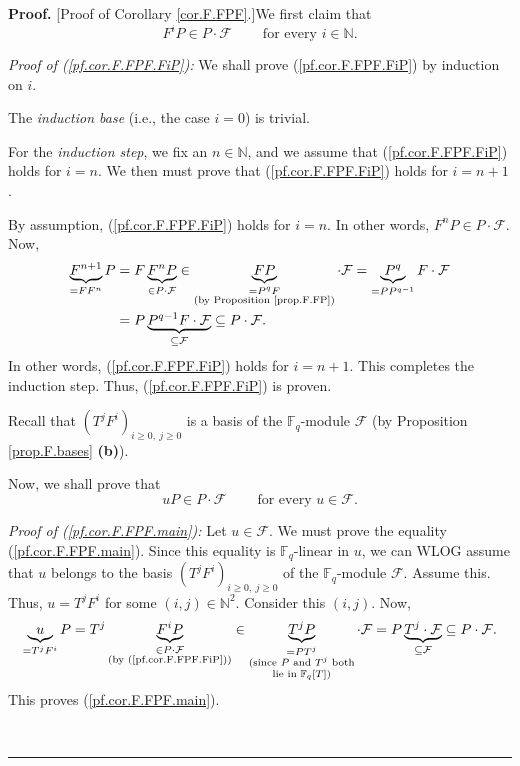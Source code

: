 \documentclass[numbers=enddot,12pt,final,onecolumn,notitlepage]{scrartcl}%
\theoremstyle{definition}
\newenvironment{proof}[1][Proof]{\noindent\textbf{#1.} }{\ \rule{0.5em}{0.5em}}
\begin{document}
\begin{proof}
[Proof of Corollary \ref{cor.F.FPF}.]We first claim that%
\begin{equation}
F^{i}P\in P\cdot\mathcal{F}\ \ \ \ \ \ \ \ \ \ \text{for every }i\in
\mathbb{N}. \label{pf.cor.F.FPF.FiP}%
\end{equation}


\textit{Proof of (\ref{pf.cor.F.FPF.FiP}):} We shall prove
(\ref{pf.cor.F.FPF.FiP}) by induction on $i$.

The \textit{induction base} (i.e., the case $i=0$) is trivial.

For the \textit{induction step}, we fix an $n\in\mathbb{N}$, and we assume
that (\ref{pf.cor.F.FPF.FiP}) holds for $i=n$. We then must prove that
(\ref{pf.cor.F.FPF.FiP}) holds for $i=n+1$.

By assumption, (\ref{pf.cor.F.FPF.FiP}) holds for $i=n$. In other words,
$F^{n}P\in P\cdot\mathcal{F}$. Now,%
\begin{align*}
\underbrace{F^{n+1}}_{=FF^{n}}P  &  =F\underbrace{F^{n}P}_{\in P\cdot
\mathcal{F}}\in\underbrace{FP}_{\substack{=P^{q}F\\\text{(by Proposition
\ref{prop.F.FP})}}}\cdot\mathcal{F}=\underbrace{P^{q}}_{=PP^{q-1}}%
F\cdot\mathcal{F}\\
&  =P\underbrace{P^{q-1}F\cdot\mathcal{F}}_{\subseteq\mathcal{F}}\subseteq
P\cdot\mathcal{F}.
\end{align*}
In other words, (\ref{pf.cor.F.FPF.FiP}) holds for $i=n+1$. This completes the
induction step. Thus, (\ref{pf.cor.F.FPF.FiP}) is proven.

Recall that $\left(  T^{j}F^{i}\right)  _{i\geq0,\ j\geq0}$ is a basis of the
$\mathbb{F}_{q}$-module $\mathcal{F}$ (by Proposition \ref{prop.F.bases}
\textbf{(b)}).

Now, we shall prove that%
\begin{equation}
uP\in P\cdot\mathcal{F}\ \ \ \ \ \ \ \ \ \ \text{for every }u\in\mathcal{F}.
\label{pf.cor.F.FPF.main}%
\end{equation}


\textit{Proof of (\ref{pf.cor.F.FPF.main}):} Let $u\in\mathcal{F}$. We must
prove the equality (\ref{pf.cor.F.FPF.main}). Since this equality is
$\mathbb{F}_{q}$-linear in $u$, we can WLOG assume that $u$ belongs to the
basis $\left(  T^{j}F^{i}\right)  _{i\geq0,\ j\geq0}$ of the $\mathbb{F}_{q}%
$-module $\mathcal{F}$. Assume this. Thus, $u=T^{j}F^{i}$ for some $\left(
i,j\right)  \in\mathbb{N}^{2}$. Consider this $\left(  i,j\right)  $. Now,%
\[
\underbrace{u}_{=T^{j}F^{i}}P=T^{j}\underbrace{F^{i}P}_{\substack{\in
P\cdot\mathcal{F}\\\text{(by (\ref{pf.cor.F.FPF.FiP}))}}}\in\underbrace{T^{j}%
P}_{\substack{=PT^{j}\\\text{(since }P\text{ and }T^{j}\text{ both}\\\text{lie
in }\mathbb{F}_{q}\left[  T\right]  \text{)}}}\cdot\mathcal{F}%
=P\underbrace{T^{j}\cdot\mathcal{F}}_{\subseteq\mathcal{F}}\subseteq
P\cdot\mathcal{F}.
\]
This proves (\ref{pf.cor.F.FPF.main}).


\end{proof}
\end{document}
